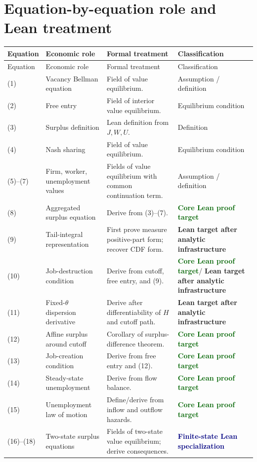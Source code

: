 \documentclass[11pt]{article}
\newcommand{\core}{\textcolor{darkGreen}{\textbf{Core Lean proof target}}}
\newcommand{\infra}{\textcolor{darkAmber}{\textbf{Lean target after analytic infrastructure}}}
\newcommand{\finite}{\textcolor{navy}{\textbf{Finite-state Lean specialization}}}
\begin{document}
\appendix
\newpage
\section{Equation-by-equation role and Lean treatment}

\small
\begin{longtable}{>{\raggedright\arraybackslash}p{} >{\raggedright\arraybackslash}p{} >{\raggedright\arraybackslash}p{} >{\raggedright\arraybackslash}p{}}
\toprule
Equation & Economic role & Formal treatment & Classification \\
\midrule
\endfirsthead
\toprule
Equation & Economic role & Formal treatment & Classification \\
\midrule
\endhead
(1) & Vacancy Bellman equation & Field of value equilibrium. & Assumption / definition \\
(2) & Free entry & Field of interior value equilibrium. & Equilibrium condition \\
(3) & Surplus definition & Lean definition from $J,W,U$. & Definition \\
(4) & Nash sharing & Field of value equilibrium. & Equilibrium condition \\
(5)--(7) & Firm, worker, unemployment values & Fields of value equilibrium with common continuation term. & Assumption / definition \\
(8) & Aggregated surplus equation & Derive from (3)--(7). & \core \\
(9) & Tail-integral representation & First prove measure positive-part form; recover CDF form. & \infra \\
(10) & Job-destruction condition & Derive from cutoff, free entry, and (9). & \core / \infra \\
(11) & Fixed-$\theta$ dispersion derivative & Derive after differentiability of $H$ and cutoff path. & \infra \\
(12) & Affine surplus around cutoff & Corollary of surplus-difference theorem. & \core \\
(13) & Job-creation condition & Derive from free entry and (12). & \core \\
(14) & Steady-state unemployment & Derive from flow balance. & \core \\
(15) & Unemployment law of motion & Define/derive from inflow and outflow hazards. & \core \\
(16)--(18) & Two-state surplus equations & Fields of two-state value equilibrium; derive consequences. & \finite \\

\end{longtable}
\end{document}
